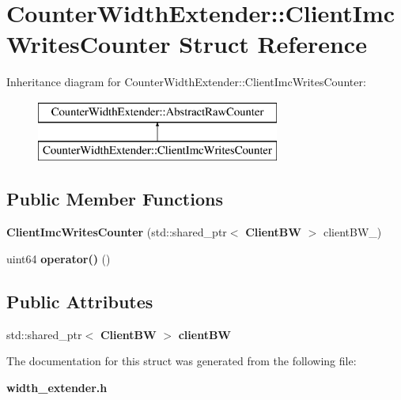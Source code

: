 \section{Counter\+Width\+Extender\+:\+:Client\+Imc\+Writes\+Counter Struct Reference}
\label{structCounterWidthExtender_1_1ClientImcWritesCounter}
Inheritance diagram for Counter\+Width\+Extender\+:\+:Client\+Imc\+Writes\+Counter\+:\begin{figure}[H]
\begin{center}
\leavevmode
\includegraphics[height=2.000000cm]{structCounterWidthExtender_1_1ClientImcWritesCounter}
\end{center}
\end{figure}
\subsection*{Public Member Functions}
\begin{DoxyCompactItemize}
\item 
\mbox{\label{structCounterWidthExtender_1_1ClientImcWritesCounter_a7df3cec47a653dadcb46368a5a3a1e85}} 
{\bfseries Client\+Imc\+Writes\+Counter} (std\+::shared\+\_\+ptr$<$ \textbf{ Client\+BW} $>$ client\+B\+W\+\_\+)
\item 
\mbox{\label{structCounterWidthExtender_1_1ClientImcWritesCounter_a3156907cb67016aea3255b75d7a887cb}} 
uint64 {\bfseries operator()} ()
\end{DoxyCompactItemize}
\subsection*{Public Attributes}
\begin{DoxyCompactItemize}
\item 
\mbox{\label{structCounterWidthExtender_1_1ClientImcWritesCounter_a4dcb0451c4b5797040d3c439447312fc}} 
std\+::shared\+\_\+ptr$<$ \textbf{ Client\+BW} $>$ {\bfseries client\+BW}
\end{DoxyCompactItemize}


The documentation for this struct was generated from the following file\+:\begin{DoxyCompactItemize}
\item 
\textbf{ width\+\_\+extender.\+h}\end{DoxyCompactItemize}
